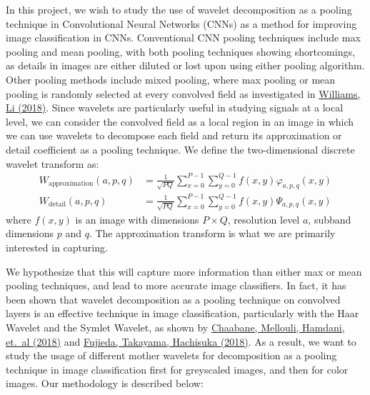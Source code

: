 \documentclass{article}
\begin{document}
\noindent In this project, we wish to study the use of wavelet decomposition as a pooling technique in Convolutional Neural Networks (CNNs) as a method for improving image classification in CNNs. Conventional CNN pooling techniques include max pooling and mean pooling, with both pooling techniques showing shortcomings, as details in images are either diluted or lost upon using either pooling algorithm. Other pooling methods include mixed pooling, where max pooling or mean pooling is randomly selected at every convolved field as investigated in \href{https://openreview.net/pdf?id=rkhlb8lCZ}{Williams, Li (2018)}. Since wavelets are particularly useful in studying signals at a local level, we can consider the convolved field as a local region in an image in which we can use wavelets to decompose each field and return its approximation or detail coefficient as a pooling technique. We define the two-dimensional discrete wavelet transform as:
\begin{align*}
W_{\text{approximation}}(a,p,q) &= \frac{1}{\sqrt{PQ}}\sum_{x=0}^{P-1}\sum_{y=0}^{Q-1}f(x,y)\varphi_{a,p,q}(x,y)\\
W_{\text{detail}}(a,p,q) &= \frac{1}{\sqrt{PQ}}\sum_{x=0}^{P-1}\sum_{y=0}^{Q-1}f(x,y)\Psi_{a,p,q}(x,y)
\end{align*}
where $f(x,y)$ is an image with dimensions $P\times Q$, resolution level $a$, subband dimensions $p$ and $q$. The approximation transform is what we are primarily interested in capturing.
\newline
\newline

\noindent
We hypothesize that this will capture more information than either max or mean pooling techniques, and lead to more accurate image classifiers. In fact, it has been shown that wavelet decomposition as a pooling technique on convolved layers is an effective technique in image classification, particularly with the Haar Wavelet and the Symlet Wavelet, as shown by \href{https://link.springer.com/chapter/10.1007/978-3-319-76351-4_31}{Chaabane, Mellouli, Hamdani, et.\ al (2018)} and \href{https://arxiv.org/pdf/1805.08620.pdf}{Fujieda, Takayama, Hachisuka (2018)}. As a result, we want to study the usage of different mother wavelets for decomposition as a pooling technique in image classification first for greyscaled images, and then for color images. Our methodology is described below:
\end{document}
